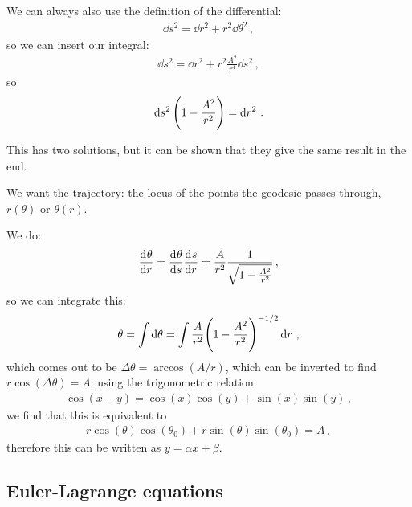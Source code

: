 \documentclass[main.tex]{subfiles}
\begin{document}
We can always also use the definition of the differential: 
%
\begin{align}
    \dd{s^2} = \dd{r^2} + r^2 \dd{\theta^2 } 
    \,,
\end{align}
%
so we can insert our integral:
%
\begin{align}
    \dd{s^2} = \dd{r^2} + r^2 \frac{A^2}{r^{4}} \dd{s^2}
\,,
\end{align}
%
so 
%
\begin{align}
  \dd{s^2} \qty(1- \frac{A^2}{r^2}) = \dd{r^2}
\,.
\end{align}

This has two solutions, but it can be shown that they give the same result in the end.

We want the trajectory: the locus of the points the geodesic passes through, \(r(\theta )\) or \(\theta (r)\).

We do: 
%
\begin{align}
  \dv[]{\theta }{r} = \dv[]{\theta }{s} \dv[]{s}{r} = \frac{A}{r^2} \frac{1}{\sqrt{1- \frac{A^2}{r^2}}}
\,,
\end{align}
%
so we can integrate this: 
%
\begin{align}
  \theta  = \int \dd{\theta } = \int
  \frac{A}{r^2} \qty(1 - \frac{A^2}{r^2})^{-1/2} \dd{r}
\,,
\end{align}
%
which comes out to be \(\Delta \theta  = \arccos (A/r)\), which can be inverted to find \(r\cos(\Delta \theta ) = A \): using the trigonometric relation 
%
\begin{align}
\cos(x-y) = \cos(x) \cos(y) + \sin(x) \sin(y)
\,,
\end{align}
%
we find that this is equivalent to 
%
\begin{align}
  r \cos(\theta ) \cos(\theta_0 ) + r \sin(\theta ) \sin(\theta_0 ) = A
\,,
\end{align}
%
therefore this can be written as \(y = \alpha x + \beta \).

\subsection{Euler-Lagrange equations}
\end{document}
